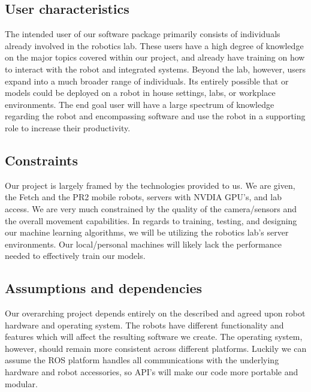 \documentclass[draftclsnofoot, onecolumn, 10pt, compsoc]{IEEEtran}
\begin{document}
	\subsection{User characteristics}
		The intended user of our software package primarily consists of individuals already involved in the robotics lab. These users have a high degree of knowledge on the major topics covered within our project, and already have training on how to interact with the robot and integrated systems. Beyond the lab, however, users expand into a much broader range of individuals. Its entirely possible that or models could be deployed on a robot in house settings, labs, or workplace environments. The end goal user will have a large spectrum of knowledge regarding the robot and encompassing software and use the robot in a supporting role to increase their productivity.
	
	\subsection{Constraints}
		Our project is largely framed by the technologies provided to us. We are given, the Fetch and the PR2 mobile robots, servers with NVDIA GPU's, and lab access. We are very much constrained by the quality of the camera/sensors and the overall movement capabilities. In regards to training, testing, and designing our machine learning algorithms, we will be utilizing the robotics lab's server environments. Our local/personal machines will likely lack the performance needed to effectively train our models.   
	
	\subsection{Assumptions and dependencies}
		Our overarching project depends entirely on the described and agreed upon robot hardware and operating system. The robots have different functionality and features which will affect the resulting software we create. The operating system, however, should remain more consistent across different platforms. Luckily we can assume the ROS platform handles all communications with the underlying hardware and robot accessories, so API's will make our code more portable and modular. 
\end{document}
